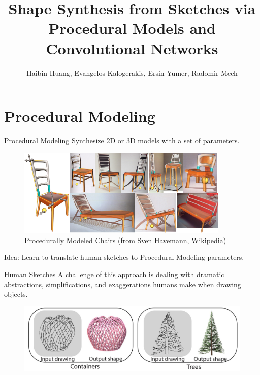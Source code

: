 \documentclass{beamer}
\title{Shape Synthesis from Sketches via Procedural Models and Convolutional Networks}
\date{}
\author{Haibin Huang, Evangelos Kalogerakis, Ersin Yumer, Radomir Mech}
\institute{Presentation by Julien}
\begin{document}
    \maketitle
    
    \section{Procedural Modeling}
    
    \begin{frame}{Procedural Modeling}
        Synthesize 2D or 3D models with a set of parameters.
        \begin{figure}
            \centering
            \includegraphics[width=0.9\textwidth]{images/GML-Stuhl-Template.png}
            \caption{Procedurally Modeled Chairs {\tiny (from Sven Havemann, Wikipedia)}}
            \label{fig:PM_Chair}
        \end{figure}
    \end{frame}
  
    \begin{frame}[standout]
        \Large
        Idea: Learn to translate human sketches to Procedural Modeling parameters.
    \end{frame}
    
    \begin{frame}{Human Sketches}
        A challenge of this approach is dealing with dramatic abstractions, simplifications, and exaggerations humans make when drawing objects.
        \begin{figure}
            \centering
            \includegraphics[width=\textwidth]{images/sketches.jpg}
            \label{fig:sketches}
        \end{figure}
    \end{frame}
    
\end{document}
